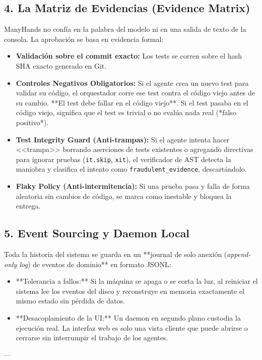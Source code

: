 \documentclass[11pt,a4paper]{article}
\begin{document}
\subsection{4. La Matriz de Evidencias (Evidence Matrix)}
ManyHands no confía en la palabra del modelo ni en una salida de texto de la consola. La aprobación se basa en evidencia formal:
\begin{itemize}
  \item \textbf{Validación sobre el commit exacto:} Los tests se corren sobre el hash SHA exacto generado en Git.
  \item \textbf{Controles Negativos Obligatorios:} Si el agente crea un nuevo test para validar su código, el orquestador corre ese test contra el código viejo antes de su cambio. **El test debe fallar en el código viejo**. Si el test pasaba en el código viejo, significa que el test es trivial o no evalúa nada real (*falso positivo*).
  \item \textbf{Test Integrity Guard (Anti-trampas):} Si el agente intenta hacer <<trampa>> borrando aserciones de tests existentes o agregando directivas para ignorar pruebas (\texttt{it.skip}, \texttt{xit}), el verificador de AST detecta la maniobra y clasifica el intento como \texttt{fraudulent\_evidence}, descartándolo.
  \item \textbf{Flaky Policy (Anti-intermitencia):} Si una prueba pasa y falla de forma aleatoria sin cambios de código, se marca como inestable y bloquea la entrega.
\end{itemize}

\subsection{5. Event Sourcing y Daemon Local}
Toda la historia del sistema se guarda en un **journal de solo anexión (\emph{append-only log}) de eventos de dominio** en formato JSONL:
\begin{itemize}
  \item **Tolerancia a fallos:** Si la máquina se apaga o se corta la luz, al reiniciar el sistema lee los eventos del disco y reconstruye en memoria exactamente el mismo estado sin pérdida de datos.
  \item **Desacoplamiento de la UI:** Un daemon en segundo plano custodia la ejecución real. La interfaz web es solo una vista cliente que puede abrirse o cerrarse sin interrumpir el trabajo de los agentes.
\end{itemize}

---
\end{document}
